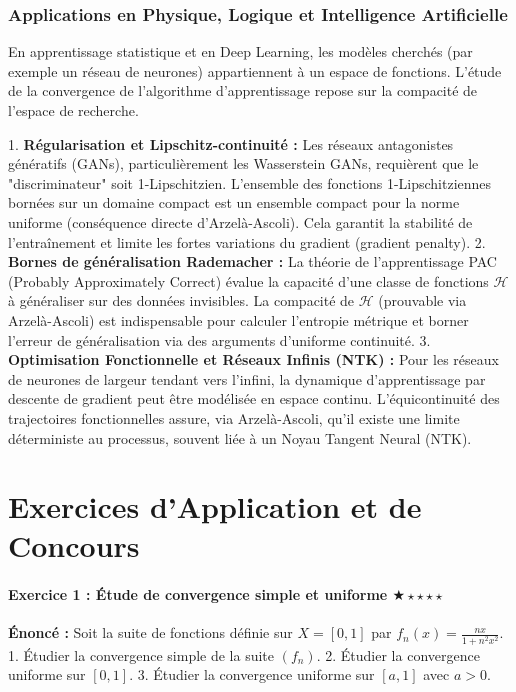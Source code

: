 \documentclass[11pt,a4paper]{article}
\begin{document}
\section{Applications en Physique, Logique et Intelligence Artificielle}

En apprentissage statistique et en Deep Learning, les modèles cherchés (par exemple un réseau de neurones) appartiennent à un espace de fonctions. L'étude de la convergence de l'algorithme d'apprentissage repose sur la compacité de l'espace de recherche.

1. \textbf{Régularisation et Lipschitz-continuité :} Les réseaux antagonistes génératifs (GANs), particulièrement les Wasserstein GANs, requièrent que le "discriminateur" soit 1-Lipschitzien. L'ensemble des fonctions 1-Lipschitziennes bornées sur un domaine compact est un ensemble compact pour la norme uniforme (conséquence directe d'Arzelà-Ascoli). Cela garantit la stabilité de l'entraînement et limite les fortes variations du gradient (gradient penalty).
2. \textbf{Bornes de généralisation Rademacher :} La théorie de l'apprentissage PAC (Probably Approximately Correct) évalue la capacité d'une classe de fonctions $\mathcal{H}$ à généraliser sur des données invisibles. La compacité de $\mathcal{H}$ (prouvable via Arzelà-Ascoli) est indispensable pour calculer l'entropie métrique et borner l'erreur de généralisation via des arguments d'uniforme continuité.
3. \textbf{Optimisation Fonctionnelle et Réseaux Infinis (NTK) :} Pour les réseaux de neurones de largeur tendant vers l'infini, la dynamique d'apprentissage par descente de gradient peut être modélisée en espace continu. L'équicontinuité des trajectoires fonctionnelles assure, via Arzelà-Ascoli, qu'il existe une limite déterministe au processus, souvent liée à un Noyau Tangent Neural (NTK).


\newpage
\part{Exercices d'Application et de Concours}

\subsection*{Exercice 1 : Étude de convergence simple et uniforme \quad $\bigstar\star\star\star\star$}

\textbf{Énoncé :}
Soit la suite de fonctions définie sur $X = [0, 1]$ par $f_n(x) = \frac{nx}{1 + n^2 x^2}$.
1. Étudier la convergence simple de la suite $(f_n)$.
2. Étudier la convergence uniforme sur $[0, 1]$.
3. Étudier la convergence uniforme sur $[a, 1]$ avec $a > 0$.
\end{document}
